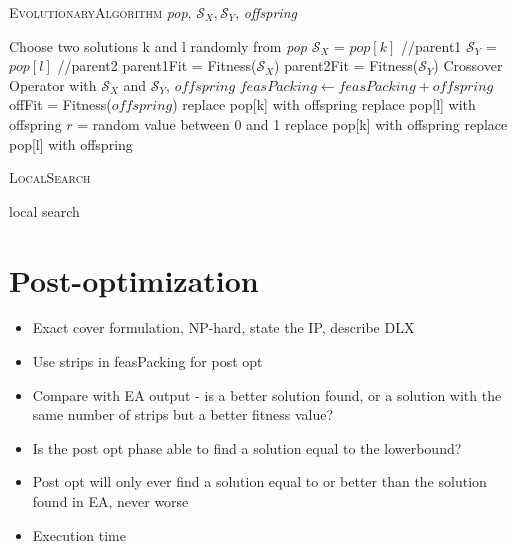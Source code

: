 \documentclass{elsarticle}
\begin{document}
\begin{algorithm}
\caption{\textsc{EvolutionaryAlgorithm} \textit{pop}, $\mathcal{S}_X, \mathcal{S}_Y$, \textit{offspring}}
\begin{algorithmic}
	\State Choose two solutions k and l randomly from \textit{pop}
	\State $\mathcal{S}_X$ = $pop[k]$ //parent1
	\State $\mathcal{S}_Y$ = $pop[l]$ //parent2
	\State parent1Fit = Fitness($\mathcal{S}_X$)
	\State parent2Fit = Fitness($\mathcal{S}_Y$)
	\Run Crossover Operator with $\mathcal{S}_X$ and $\mathcal{S}_Y$, \Output $offspring$
	\State $feasPacking \gets feasPacking + offspring$
	\State offFit = Fitness($offspring$)
		\State replace pop[k] with offspring
		\State replace pop[l] with offspring
		\State $r$ = random value between 0 and 1
			\State replace pop[k] with offspring
			\State replace pop[l] with offspring
		\EndIf		
	\EndIf	
\end{algorithmic}	
\end{algorithm}	

\begin{algorithm}
	\caption{\textsc{LocalSearch}}
	\begin{algorithmic}
		\State local search
	\end{algorithmic}	
\end{algorithm}


\section{Post-optimization}
\begin{itemize}
	\item Exact cover formulation, NP-hard, state the IP, describe DLX
	\item Use strips in feasPacking for post opt
	\item Compare with EA output - is a better solution found, or a solution with the same number of strips but a better fitness value?
	\item Is the post opt phase able to find a solution equal to the lowerbound?
	\item Post opt will only ever find a solution equal to or better than the solution found in EA, never worse
	\item Execution time
\end{itemize}
\end{document}

